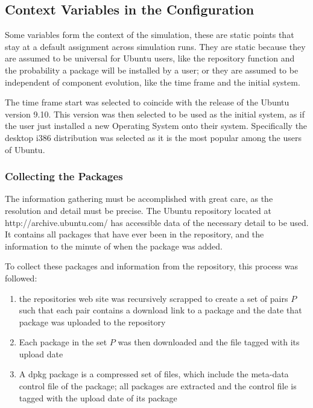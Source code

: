 \subsection{Context Variables in the Configuration}
Some variables form the context of the simulation, these are static points that stay at a default assignment across simulation runs.
They are static because they are assumed to be universal for Ubuntu users, like the repository function and the probability a package will be installed by a user;
or they are assumed to be independent of component evolution, like the time frame and the initial system.



The time frame start was selected to coincide with the release of the Ubuntu version 9.10.
This version was then selected to be used as the initial system, as if the user just installed a new Operating System onto their system.
Specifically the desktop i386 distribution was selected as it is the most popular among the users of Ubuntu.


\subsubsection{Collecting the Packages}
The information gathering must be accomplished with great care, as the resolution and detail must be precise.
The Ubuntu repository located at http://archive.ubuntu.com/ has accessible data of the necessary detail to be used.
It contains all packages that have ever been in the repository, and the information to the minute of when the package was added.

To collect these packages and information from the repository, this process was followed:
\begin{enumerate}
  \item the repositories web site was recursively scrapped to create a set of pairs $P$ 
  such that each pair contains a download link to a package and the date that package was uploaded to the repository
  \item Each package in the set $P$ was then downloaded and the file tagged with its upload date
  \item A dpkg package is a compressed set of files, 
  which include the meta-data control file of the package; all packages are extracted and the control file is tagged with the upload date of its package 
\end{enumerate}

